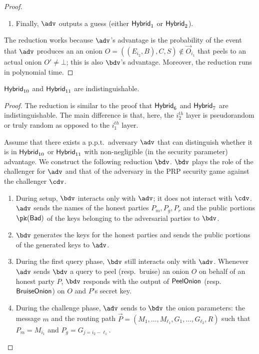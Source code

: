 \documentclass[runningheads,a4paper]{llncs}
\begin{document}
\begin{proof}
\begin{enumerate}
\item Finally, $\adv$ outputs a guess (either $\mathsf{Hybrid}_{1}$ or $\mathsf{Hybrid}_{2}$). 
\end{enumerate}
The reduction works because $\adv$'s advantage is the probability of the event that $\adv$ produces an an onion $O = ((E_{i_2}, B), C, S) \not\in \vec{O}_{i_1}$ that peels to an actual onion $O'\not=\bot$; this is also $\bdv$'s advantage. Moreover, the reduction runs in polynomial time. 
\end{proof}

\begin{lemma}
$\mathsf{Hybrid}_{10}$ and $\mathsf{Hybrid}_{11}$ are indistinguishable. 
\end{lemma}

\begin{proof}
The reduction is similar to the proof that $\mathsf{Hybrid}_{6}$ and $\mathsf{Hybrid}_{7}$ are indistinguishable. The main difference is that, here, the $i_2^\mathit{th}$ layer is pseudorandom or truly random as opposed to the $i_1^\mathit{th}$ layer. 

Assume that there exists a p.p.t.~adversary $\adv$ that can distinguish whether it is in $\mathsf{Hybrid}_{10}$ or $\mathsf{Hybrid}_{11}$ with non-negligible (in the security parameter)  advantage. 
We construct the following reduction $\bdv$. $\bdv$ plays the role of the challenger for $\adv$ and that of the adversary in the PRP security game against the  challenger $\cdv$. 

\begin{enumerate}
\item During setup, $\bdv$ interacts only with $\adv$; it does not interact with $\cdv$. $\adv$ sends the names of the honest parties $P_m, P_g, P_r$ and the public portions $\pk(\Bad)$ of the keys  belonging to the adversarial parties to $\bdv$. 

\item $\bdv$ generates the keys for the honest parties and sends the public portions of the generated keys to $\adv$. 

\item During the first query phase, $\bdv$ still interacts only with $\adv$. Whenever $\adv$ sends $\bdv$ a query to peel (resp.~bruise) an onion $O$ on behalf of an honest party $P$, $\bdv$ responds with the output of $\mathsf{PeelOnion}$ (resp.~$\mathsf{BruiseOnion}$) on $O$ and $P$'s secret key. 

\item During the challenge phase, $\adv$ sends to $\bdv$ the onion parameters: the message $m$ and the routing path $\vec{P} = (M_1, \dots, M_{\ell_1}, G_1, \dots, G_{\ell_2}, R)$ such that $P_m = M_{i_1}$ and $P_g = G_{j=i_2-\ell_1}$. 


\end{enumerate}
\end{proof}
\end{document}
